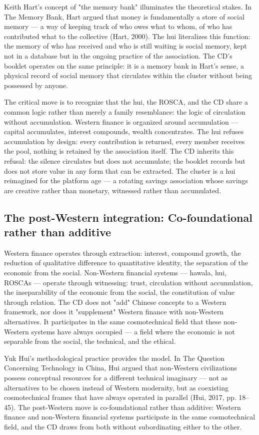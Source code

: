 Keith Hart's concept of "the memory bank" illuminates the theoretical stakes. In The Memory Bank, Hart argued that money is fundamentally a store of social memory — a way of keeping track of who owes what to whom, of who has contributed what to the collective (Hart, 2000). The hui literalizes this function: the memory of who has received and who is still waiting is social memory, kept not in a database but in the ongoing practice of the association. The CD's booklet operates on the same principle: it is a memory bank in Hart's sense, a physical record of social memory that circulates within the cluster without being possessed by anyone.

The critical move is to recognize that the hui, the ROSCA, and the CD share a common logic rather than merely a family resemblance: the logic of circulation without accumulation. Western finance is organized around accumulation — capital accumulates, interest compounds, wealth concentrates. The hui refuses accumulation by design: every contribution is returned, every member receives the pool, nothing is retained by the association itself. The CD inherits this refusal: the silence circulates but does not accumulate; the booklet records but does not store value in any form that can be extracted. The cluster is a hui reimagined for the platform age — a rotating savings association whose savings are creative rather than monetary, witnessed rather than accumulated.

\subsection{The post-Western integration: Co-foundational rather than additive}

Western finance operates through extraction: interest, compound growth, the reduction of qualitative difference to quantitative identity, the separation of the economic from the social. Non-Western financial systems — hawala, hui, ROSCAs — operate through witnessing: trust, circulation without accumulation, the inseparability of the economic from the social, the constitution of value through relation. The CD does not "add" Chinese concepts to a Western framework, nor does it "supplement" Western finance with non-Western alternatives. It participates in the same cosmotechnical field that these non-Western systems have always occupied — a field where the economic is not separable from the social, the technical, and the ethical.

Yuk Hui's methodological practice provides the model. In The Question Concerning Technology in China, Hui argued that non-Western civilizations possess conceptual resources for a different technical imaginary — not as alternatives to be chosen instead of Western modernity, but as coexisting cosmotechnical frames that have always operated in parallel (Hui, 2017, pp. 18–45). The post-Western move is co-foundational rather than additive: Western finance and non-Western financial systems participate in the same cosmotechnical field, and the CD draws from both without subordinating either to the other.

